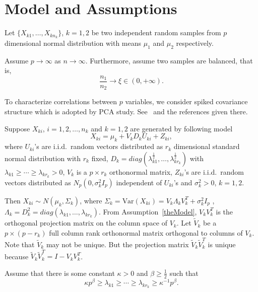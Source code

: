 
\section{Model and Assumptions}


Let $\{X_{k1},\ldots,X_{kn_k}\}$, $k=1, 2$ be two independent  random samples from $p$ dimensional normal distribution with means $\mu_1$ and $\mu_2$ respectively.

\begin{assumption}\label{balance}
Assume $p\to \infty$ as $n\to \infty$. Furthermore, assume two samples are balanced, that is,
\begin{equation*}
    \frac{n_1}{n_2}\to \xi \in (0,+\infty).
\end{equation*}
\end{assumption}

To characterize correlations between $p$ variables, we consider spiked covariance structure which is adopted by PCA study. See~\cite{Cai2012Sparse} and the references given there.
\begin{assumption}\label{theModel}
Suppose $X_{ki}$, $i=1,2,\ldots,n_k$ and $k=1,2$ are generated by following model
\begin{equation*}
X_{ki}=\mu_k+V_k D_k U_{ki}+Z_{ki},
\end{equation*}
where
$U_{ki}$'s are i.i.d.\  random vectors distributed as $r_k$ dimensional standard normal distribution with $r_k$ fixed, 
$D_k=diag(\lambda_{k1}^{\frac{1}{2}},\ldots,\lambda_{k{r_k}}^{\frac{1}{2}})$ with $\lambda_{k1}\geq \cdots \geq \lambda_{k{r_k}}>0$,
$V_k$ is  a $p\times r_k$ orthonormal matrix, $Z_{ki}$'s are i.i.d.\ random vectors distributed as  $N_p(0,\sigma^2_k I_p)$ independent of $U_{ki}$'s and $\sigma^2_k>0$, $k=1,2$.
\end{assumption}
Then $X_{ki}\sim N(\mu_k,\Sigma_k)$, where $ 
\Sigma_k=\textrm{Var}(X_{ki})=V_k\Lambda_k V_k^T+\sigma^2_k I_p
$
, $\Lambda_k=D_k^2=diag(\lambda_{k1},\ldots,\lambda_{k{r_k}})$.
From Assumption~\ref{theModel}, $V_k V_k^T$ is the orthogonal projection matrix on the column space of $V_k$. Let $\tilde{V}_k$ be a $p\times (p-r_k)$ full column rank orthonormal matrix orthogonal to columns of  $V_k$.
 Note that $\tilde{V}_k$ may not be unique. But the projection matrix $\tilde{V}_k\tilde{V}_k^T$ is unique because $\tilde{V}_k\tilde{V}_k^T=I-V_k V_k^T$.


\begin{assumption}\label{orderOfBeta}
    Assume that there is some constant $\kappa>0$ and $\beta\geq \frac{1}{2}$ such that
    \begin{equation*}
        \kappa p^{\beta}\geq \lambda_{k1}\geq \cdots \geq\lambda_{kr_k}\geq \kappa^{-1}p^{\beta}.
\end{equation*}
\end{assumption}


